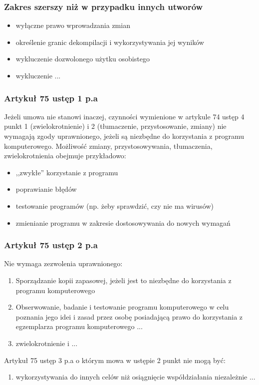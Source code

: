 \documentclass[12pt,a4paper]{article}
\begin{document}
\subsubsection{Zakres szerszy niż w przypadku innych utworów}
\begin{itemize}
\item wyłączne prawo wprowadzania zmian
\item określenie granic dekompilacji i wykorzystywania jej wyników
\item wykluczenie dozwolonego użytku osobistego
\item wykluczenie ...
\end{itemize}

\subsubsection{Artykuł 75 ustęp 1 p.a}
Jeżeli umowa nie stanowi inaczej, czynności wymienione w artykule 74 ustęp 4 punkt 1 (zwielokrotnienie) i 2 (tłumaczenie, przystosowanie, zmiany) nie wymagają zgody uprawnionego, jeżeli są niezbędne do korzystania z programu komputerowego. Możliwość zmiany, przystosowywania, tłumaczenia, zwielokrotnienia obejmuje przykładowo:
\begin{itemize}
\item ,,zwykłe'' korzystanie z programu
\item poprawianie błędów
\item testowanie programów (np.  żeby sprawdzić, czy nie ma wirusów)
\item zmienianie programu w zakresie dostosowywania do nowych wymagań
\end{itemize} 

\subsubsection{Artykuł 75 ustęp 2 p.a}
Nie wymaga zezwolenia uprawnionego:
\begin{enumerate}
\item Sporządzanie kopii zapasowej, jeżeli jest to niezbędne do korzystania z programu komputerowego 
\item Obserwowanie, badanie i testowanie programu komputerowego w celu poznania jego idei i zasad przez osobę posiadającą prawo do korzystania z egzemplarza programu komputerowego ...
\item zwielokrotnienie i ...
\end{enumerate}

Artykuł 75 ustęp 3 p.a o którym mowa w ustępie 2 punkt nie mogą być:
\begin{enumerate}
\item wykorzystywania  do innych celów niż osiągnięcie współdziałania niezależnie ...
\end{enumerate}
\end{document}
